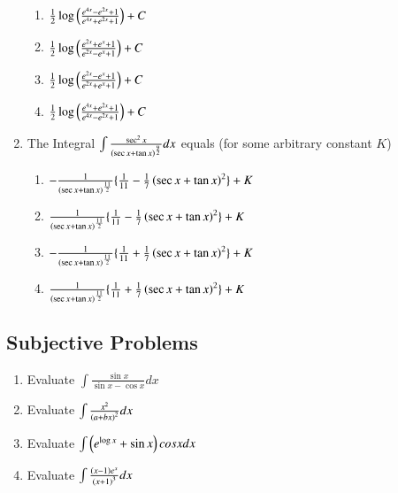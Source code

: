 \documentclass[article,12pt,onecolumn]{IEEEtran}
\theoremstyle{remark}
\begin{document}
\begin{enumerate}
\hfill{}
\begin{multicols}{2}
\begin{enumerate}
    \item $\frac{1}{2}\log\left(\frac{e^{4x}-e^{2x}+1}{e^{4x}+e^{2x}+1}\right) + C$
    \item $\frac{1}{2}\log\left(\frac{e^{2x}+e^{x}+1}{e^{2x}-e^{x}+1}\right) + C$
    \item $\frac{1}{2}\log\left(\frac{e^{2x}-e^{x}+1}{e^{2x}+e^{x}+1}\right) + C$ 
    \item $\frac{1}{2}\log\left(\frac{e^{4x}+e^{2x}+1}{e^{4x}-e^{2x}+1}\right) + C$
\end{enumerate}
\end{multicols}
\item The Integral $\int\frac{\sec^{2}x}{\left(\sec x +\tan x\right)^\frac{9}{2}}dx $  equals (for some arbitrary constant $K$)
\hfill {}
\begin{enumerate}
    \item $-\frac{1}{\left(\sec x + \tan x\right)^{\frac{11}{2}}} \{ \frac{1}{11} - \frac{1}{7}\left(\sec x +\tan x\right)^{2}\} + K$
    \item $\frac{1}{\left(\sec x + \tan x\right)^{\frac{11}{2}}} \{ \frac{1}{11} - \frac{1}{7}\left(\sec x +\tan x\right)^{2}\} + K$
    \item $-\frac{1}{\left(\sec x + \tan x\right)^{\frac{11}{2}}} \{ \frac{1}{11} + \frac{1}{7}\left(\sec x +\tan x\right)^{2}\} + K$
    \item  $\frac{1}{\left(\sec x + \tan x\right)^{\frac{11}{2}}} \{ \frac{1}{11} + \frac{1}{7}\left(\sec x +\tan x\right)^{2}\} + K$
\end{enumerate}
\end{enumerate}
\subsection{Subjective Problems}    
\begin{enumerate}
\item Evaluate $\int \frac{\sin x}{\sin x - \cos x}dx $
\hfill{}
\item Evaluate $\int \frac{x^{2}}{\left(a+bx\right)^{2}}dx$
\hfill {}
\item Evaluate $\int \left(e^{\log x} + \sin x\right)cos xdx $
\hfill {}
\item Evaluate $\int \frac{\left(x-1\right)e^{x}}{\left(x+1\right)^{3}} dx$
\hfill {}
\end{enumerate}
\end{document}
